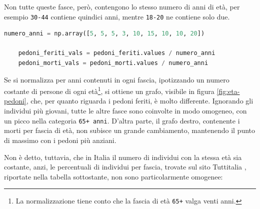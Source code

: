 \documentclass[a4paper,12pt]{report}
\newcommand{\columnstyle}[1]{\texttt{#1}}
\begin{document}
Non tutte queste fasce, però, contengono lo stesso numero di anni di età, 
per esempio \columnstyle{30-44} contiene quindici anni, mentre 
\columnstyle{18-20} ne contiene solo due.

\begin{lstlisting}[language=Python]
    numero_anni = np.array([5, 5, 5, 3, 10, 15, 10, 10, 20])

    pedoni_feriti_vals = pedoni_feriti.values / numero_anni
    pedoni_morti_vals = pedoni_morti.values / numero_anni
\end{lstlisting}

Se si normalizza per anni contenuti in ogni fascia, ipotizzando un numero 
costante di persone di ogni età\footnote{La normalizzazione tiene conto 
che la fascia di età \columnstyle{65+} valga venti anni.}, 
si ottiene un grafo, visibile in figura \ref{fig:eta-pedoni}, che, per 
quanto riguarda i pedoni feriti, è molto differente.
Ignorando gli individui più giovani, tutte le altre fasce sono coinvolte 
in modo omogeneo, con un picco nella categoria \columnstyle{65+ anni}.
D'altra parte, il grafo destro, contenente i morti per fascia di età, 
non subisce un grande cambiamento, mantenendo il punto di massimo con 
i pedoni più anziani.

Non è detto, tuttavia, che in Italia il numero di individui con 
la stessa età sia costante, anzi, le percentuali di individui per fascia, 
trovate sul sito Tuttitalia \cite{TUTTITALIA:1}, riportate nella tabella 
sottostante, non sono particolarmente omogenee: 
\end{document}
